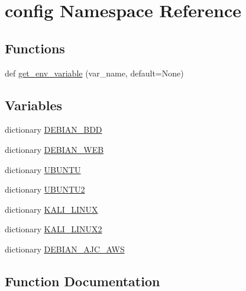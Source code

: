 \hypertarget{namespaceconfig}{}\section{config Namespace Reference}
\label{namespaceconfig}
\subsection*{Functions}
\begin{DoxyCompactItemize}
\item 
def \hyperlink{namespaceconfig_a7cf1bd9315cd5f3237441a2d9414082d}{get\+\_\+env\+\_\+variable} (var\+\_\+name, default=None)
\end{DoxyCompactItemize}
\subsection*{Variables}
\begin{DoxyCompactItemize}
\item 
dictionary \hyperlink{namespaceconfig_a71816e4f95571e210c3a11901501efe1}{D\+E\+B\+I\+A\+N\+\_\+\+B\+DD}
\item 
dictionary \hyperlink{namespaceconfig_aff8b756685a16564c3e9cd25f0164ed0}{D\+E\+B\+I\+A\+N\+\_\+\+W\+EB}
\item 
dictionary \hyperlink{namespaceconfig_a722da23285ba8345159995861911a3b4}{U\+B\+U\+N\+TU}
\item 
dictionary \hyperlink{namespaceconfig_a6579f0a8b9b00feef5c78067411e8666}{U\+B\+U\+N\+T\+U2}
\item 
dictionary \hyperlink{namespaceconfig_a1583c06065c1cef60bf9da180f5482f6}{K\+A\+L\+I\+\_\+\+L\+I\+N\+UX}
\item 
dictionary \hyperlink{namespaceconfig_a087dd3633f6caa5a0ae259f99d9d6d47}{K\+A\+L\+I\+\_\+\+L\+I\+N\+U\+X2}
\item 
dictionary \hyperlink{namespaceconfig_af8dfe12d507571f5fb9183033d873043}{D\+E\+B\+I\+A\+N\+\_\+\+A\+J\+C\+\_\+\+A\+WS}
\end{DoxyCompactItemize}


\subsection{Function Documentation}
\mbox{\label{namespaceconfig_a7cf1bd9315cd5f3237441a2d9414082d}} 
